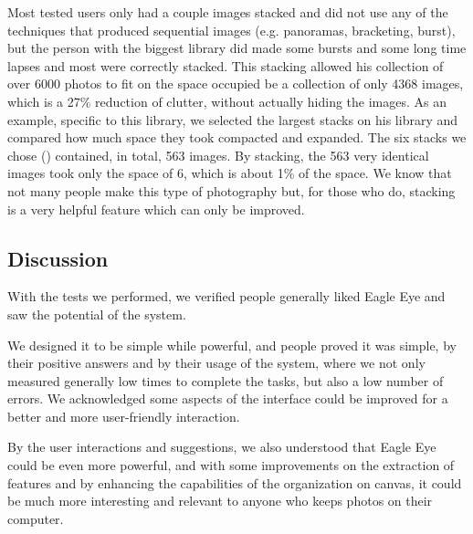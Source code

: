 {Most tested users only had a couple images stacked and did not use any of the techniques that produced sequential images (e.g. panoramas, bracketing, burst), but the person with the biggest library did made some bursts and some long time lapses and most were correctly stacked. This stacking allowed his collection of over 6000 photos to fit on the space occupied be a collection of only 4368 images, which is a 27\% reduction of clutter, without actually hiding the images. As an example, specific to this library, we selected the largest stacks on his library and compared how much space they took compacted and expanded. The six stacks we chose () contained, in total, 563 images. By stacking, the 563 very identical images took only the space of 6, which is about 1\% of the space. We know that not many people make this type of photography but, for those who do, stacking is a very helpful feature which can only be improved.






\subsection{Discussion}

With the tests we performed, we verified people generally liked Eagle Eye and saw the potential of the system.

We designed it to be simple while powerful, and people proved it was simple, by their positive answers and by their usage of the system, where we not only measured generally low times to complete the tasks, but also a low number of errors. We acknowledged some aspects of the interface could be improved for a better and more user-friendly interaction.

By the user interactions and suggestions, we also understood that Eagle Eye could be even more powerful, and with some improvements on the extraction of features and by enhancing the capabilities of the organization on canvas, it could be much more interesting and relevant to anyone who keeps photos on their computer.
}